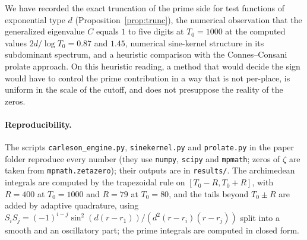 \documentclass[11pt]{amsart}
\theoremstyle{definition}
\theoremstyle{remark}
\newcommand{\Cband}{C}
\begin{document}
We have recorded the exact truncation of the prime side for test functions of exponential type $d$
(Proposition~\ref{prop:trunc}), the numerical observation that the generalized eigenvalue $\Cband$ equals $1$
to five digits at $T_0=1000$ at the computed values $2d/\log T_0=0.87$ and $1.45$, numerical sine-kernel structure in its subdominant
spectrum, and a heuristic comparison with the Connes--Consani prolate approach. On this heuristic reading, a method that would
decide the sign would have to control the prime contribution in a way that is not per-place, is uniform in the scale of the cutoff,
and does not presuppose the reality of the zeros.

\paragraph{Reproducibility.} The scripts \texttt{carleson\_engine.py}, \texttt{sinekernel.py} and
\texttt{prolate.py} in the paper folder reproduce every number (they use \texttt{numpy}, \texttt{scipy} and
\texttt{mpmath}; zeros of $\zeta$ are taken from \texttt{mpmath.zetazero}); their outputs are in
\texttt{results/}. The archimedean integrals are computed by the trapezoidal rule on $[T_0-R,T_0+R]$, with $R=400$ at
$T_0=1000$ and $R=79$ at $T_0=80$, and the tails beyond $T_0\pm R$ are added by adaptive quadrature, using
$S_iS_j=(-1)^{i-j}\sin^2(d(r-r_1))/(d^2(r-r_i)(r-r_j))$ split into a smooth and an oscillatory part; the prime
integrals are computed in closed form.
\end{document}
